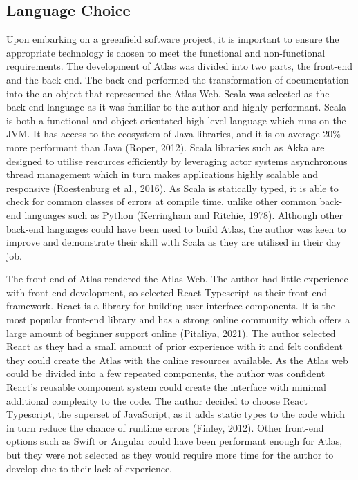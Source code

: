 \documentclass{article}
\begin{document}
\subsection{Language Choice}

Upon embarking on a greenfield software project, it is important to ensure the appropriate technology is chosen to meet the functional and non-functional requirements. The development of Atlas was divided into two parts, the front-end and the back-end. The back-end performed the transformation of documentation into the an object that represented the Atlas Web. Scala was selected as the back-end language as it was familiar to the author and highly performant. Scala is both a functional and object-orientated high level language which runs on the JVM. It has access to the ecosystem of Java libraries, and it is on average 20\% more performant than Java (Roper, 2012). Scala libraries such as Akka are designed to utilise resources efficiently by leveraging actor systems asynchronous thread management  which in turn makes applications highly scalable and responsive (Roestenburg et al., 2016). As Scala is statically typed, it is able to check for common classes of errors at compile time, unlike other common back-end languages such as Python (Kerringham and Ritchie, 1978). Although other back-end languages could have been used to build Atlas, the author was keen to improve and demonstrate their skill with Scala as they are utilised in their day job.

The front-end of Atlas rendered the Atlas Web. The author had little experience with front-end development, so selected React Typescript as their front-end framework. React is a library for building user interface components. It is the most popular front-end library and has a strong online community which offers a large amount of beginner support online (Pitaliya, 2021). The author selected React as they had a small amount of prior experience with it and felt confident they could create the Atlas with the online resources available. As the Atlas web could be divided into a few repeated components, the author was confident React’s reusable component system could create the interface with minimal additional complexity to the code. The author decided to choose React Typescript, the superset of JavaScript, as it adds static types to the code which in turn reduce the chance of runtime errors (Finley, 2012). Other front-end options such as Swift or Angular could have been performant enough for Atlas, but they were not selected as they would require more time for the author to develop due to their lack of experience.
\end{document}
